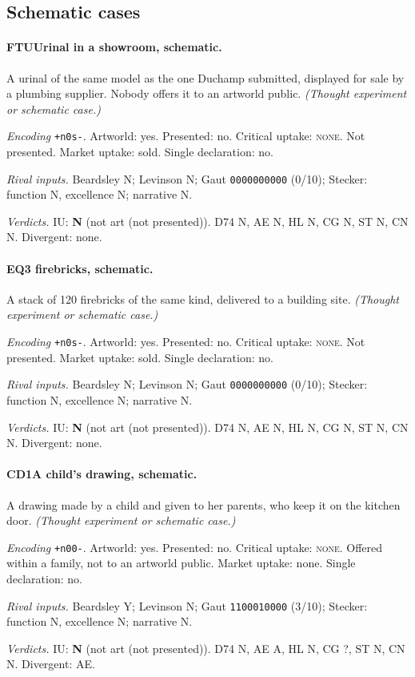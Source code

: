 \subsection{Schematic cases}

\paragraph{FTU\enspace Urinal in a showroom, schematic.}
A urinal of the same model as the one Duchamp submitted, displayed for sale by a plumbing supplier. Nobody offers it to an artworld public. \textit{(Thought experiment or schematic case.)}\par
\noindent\textit{Encoding} \texttt{+n0s-}. Artworld: yes. Presented: no. Critical uptake: \textsc{none}. Not presented. Market uptake: sold. Single declaration: no.\par
\noindent\textit{Rival inputs.} Beardsley N; Levinson N; Gaut \texttt{0000000000} (0/10); Stecker: function N, excellence N; narrative N.\par
\noindent\textit{Verdicts.} IU: \textbf{N} (not art (not presented)). D74 N, AE N, HL N, CG N, ST N, CN N. Divergent: none.\par

\paragraph{EQ3 firebricks, schematic.}
A stack of 120 firebricks of the same kind, delivered to a building site. \textit{(Thought experiment or schematic case.)}\par
\noindent\textit{Encoding} \texttt{+n0s-}. Artworld: yes. Presented: no. Critical uptake: \textsc{none}. Not presented. Market uptake: sold. Single declaration: no.\par
\noindent\textit{Rival inputs.} Beardsley N; Levinson N; Gaut \texttt{0000000000} (0/10); Stecker: function N, excellence N; narrative N.\par
\noindent\textit{Verdicts.} IU: \textbf{N} (not art (not presented)). D74 N, AE N, HL N, CG N, ST N, CN N. Divergent: none.\par

\paragraph{CD1\enspace A child's drawing, schematic.}
A drawing made by a child and given to her parents, who keep it on the kitchen door. \textit{(Thought experiment or schematic case.)}\par
\noindent\textit{Encoding} \texttt{+n00-}. Artworld: yes. Presented: no. Critical uptake: \textsc{none}. Offered within a family, not to an artworld public. Market uptake: none. Single declaration: no.\par
\noindent\textit{Rival inputs.} Beardsley Y; Levinson N; Gaut \texttt{1100010000} (3/10); Stecker: function N, excellence N; narrative N.\par
\noindent\textit{Verdicts.} IU: \textbf{N} (not art (not presented)). D74 N, AE A, HL N, CG ?, ST N, CN N. Divergent: AE.\par


